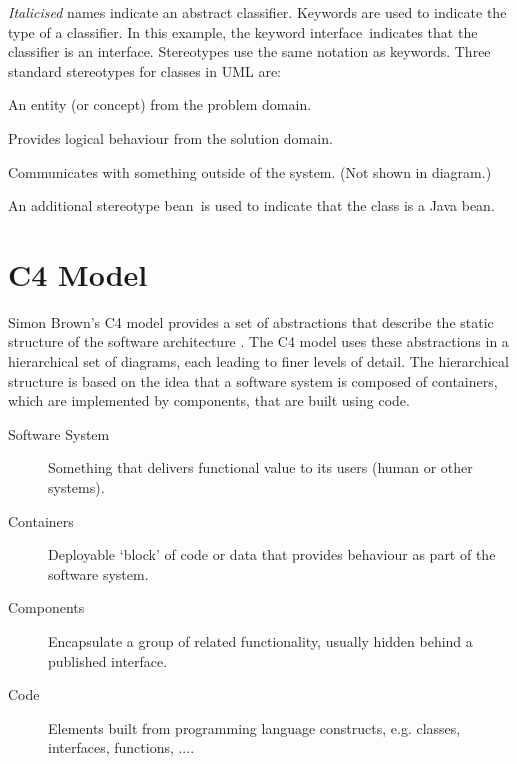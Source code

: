 \textit{Italicised} names indicate an abstract classifier. Keywords are used to indicate the type of a classifier.
In this example, the keyword \guillemotleft interface\guillemotright~indicates that the classifier is an interface.
Stereotypes use the same notation as keywords. Three standard stereotypes for classes in UML are:
\begin{description}[nosep,left=5mm]
    \item[\guillemotleft entity\guillemotright] An entity (or concept) from the problem domain.
    \item[\guillemotleft control\guillemotright] Provides logical behaviour from the solution domain.
    \item[\guillemotleft boundary\guillemotright] Communicates with something outside of the system. (Not shown in diagram.)
\end{description}
An additional stereotype \guillemotleft bean\guillemotright~is used to indicate that the class is a Java bean.

\section{C4 Model}
Simon Brown's C4 model provides a set of abstractions that describe the static structure of the software architecture \cite{brown2022c4}.
The C4 model uses these abstractions in a hierarchical set of diagrams, each leading to finer levels of detail.
The hierarchical structure is based on the idea that a software system is composed of containers, which are implemented by components, that are built using code.
\begin{description}
    \item[Software System] Something that delivers functional value to its users (human or other systems).
    \item[Containers] Deployable `block' of code or data that provides behaviour as part of the software system.
    \item[Components] Encapsulate a group of related functionality, usually hidden behind a published interface.
    \item[Code] Elements built from programming language constructs, e.g. classes, interfaces, functions, ....
\end{description}


